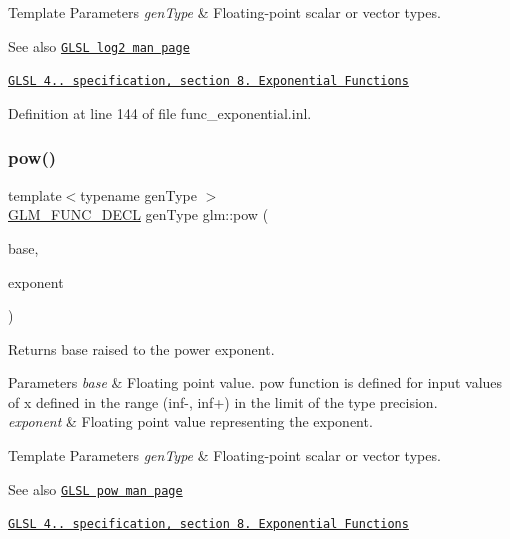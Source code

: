 \begin{DoxyTemplParams}{Template Parameters}
{\em gen\+Type} & Floating-\/point scalar or vector types.\\
\hline
\end{DoxyTemplParams}
\begin{DoxySeeAlso}{See also}
\href{http://www.opengl.org/sdk/docs/manglsl/xhtml/log2.xml}{\tt G\+L\+SL log2 man page} 

\href{http://www.opengl.org/registry/doc/GLSLangSpec.4.20.8.pdf}{\tt G\+L\+SL 4.. specification, section 8. Exponential Functions} 
\end{DoxySeeAlso}


Definition at line 144 of file func\+\_\+exponential.\+inl.

\mbox{\label{group__core__func__exponential_ga1ce4b2fddd26d0d3a35a8d98f37f3ac0}} 
\subsubsection{\texorpdfstring{pow()}{pow()}}
{\footnotesize\ttfamily template$<$typename gen\+Type $>$ \\
\hyperlink{setup_8hpp_ab2d052de21a70539923e9bcbf6e83a51}{G\+L\+M\+\_\+\+F\+U\+N\+C\+\_\+\+D\+E\+CL} gen\+Type glm\+::pow (\begin{DoxyParamCaption}\item[{gen\+Type const \&}]{base,  }\item[{gen\+Type const \&}]{exponent }\end{DoxyParamCaption})}

Returns \textquotesingle{}base\textquotesingle{} raised to the power \textquotesingle{}exponent\textquotesingle{}.


\begin{DoxyParams}{Parameters}
{\em base} & Floating point value. pow function is defined for input values of x defined in the range (inf-\/, inf+) in the limit of the type precision. \\
\hline
{\em exponent} & Floating point value representing the \textquotesingle{}exponent\textquotesingle{}. \\
\hline
\end{DoxyParams}

\begin{DoxyTemplParams}{Template Parameters}
{\em gen\+Type} & Floating-\/point scalar or vector types.\\
\hline
\end{DoxyTemplParams}
\begin{DoxySeeAlso}{See also}
\href{http://www.opengl.org/sdk/docs/manglsl/xhtml/pow.xml}{\tt G\+L\+SL pow man page} 

\href{http://www.opengl.org/registry/doc/GLSLangSpec.4.20.8.pdf}{\tt G\+L\+SL 4.. specification, section 8. Exponential Functions} 
\end{DoxySeeAlso}



